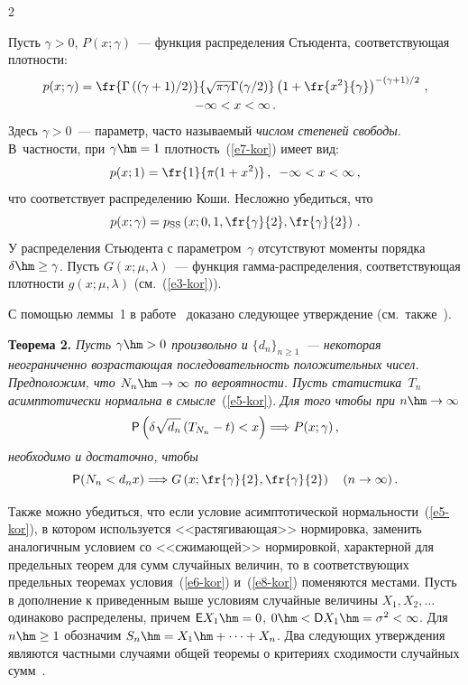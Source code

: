 \begin{multicols}{2}
\smallskip

Пусть $\gamma>0$, $P(x;\gamma)$~--- функция распределения
Стьюдента, соответствующая плот\-ности:
\begin{multline}
p(x;\gamma) =
\fr{\Gamma\left((\gamma+1)/2\right)}{\sqrt{\pi\gamma}\Gamma
(\gamma/2)}\left(1+\fr{x^2}{\gamma}\right)^{-(\gamma+1)/2}\,,\\
 -\infty<x<\infty\,.\label{e7-kor}
\end{multline}
Здесь $\gamma>0$~--- параметр, часто называемый \textit{чис\-лом
степеней свободы}. В~частности, при $\gamma\hm=1$ плот\-ность~(\ref{e7-kor}) имеет
вид:
$$
p(x;1)=\fr{1}{\pi(1+x^2)}\,,\enskip  -\infty<x<\infty\,,
$$
что соответствует распределению Коши. Несложно убедиться, что
$$
p(x;\gamma)=p_{\mathrm{SS}}\left(x;0,1,\fr{\gamma}{2},\fr{\gamma}{2}\right)\,.
$$
У распределения Стьюдента с параметром~$\gamma$ отсутствуют
моменты порядка $\delta\hm\ge\gamma$. Пусть $G(x;\mu,\lambda)$~---
функция гам\-ма-рас\-пре\-де\-ле\-ния, соответствующая плот\-ности
$g(x;\mu,\lambda)$ (см.~(\ref{e3-kor})).

С помощью леммы~1 в работе~\cite{BeningKorolev2004} доказано
следующее утверждение (см.\ так\-же~\cite{Korolev2011, KorolevBeningShorgin2011}).

\smallskip

\noindent
\textbf{Теорема 2.} \textit{Пусть $\gamma\hm>0$ произвольно и
$\{d_n\}_{n\ge1}$~--- некоторая неограниченно возрастающая
последовательность положительных чисел. Предположим, что
$N_n\hm\to\infty$ по вероятности. Пусть статистика~$T_n$
асимптотически нормальна в смысле}~(\ref{e5-kor}). \textit{Для того чтобы при}
$n\hm\to\infty$
$$
{\sf P}\left(\delta\sqrt{d_n}\left(T_{N_n}-t\right)<x\right) 
\Longrightarrow  P(x;\gamma)\,,
$$
\textit{необходимо и достаточно, чтобы}
\begin{equation}
{\sf P}(N_n<d_nx)\Longrightarrow G\left(x;\fr{\gamma}{2},\fr{\gamma}{2}\right)\quad
(n\to\infty)\,.\label{e8-kor}
\end{equation}

\smallskip

Также можно убедиться, что если условие асимптотической
нормальности~(\ref{e5-kor}), в котором используется <<растягивающая>>
нормировка, заменить аналогич\-ным условием со <<сжимающей>>
нормировкой, характерной для предельных теорем для сумм случайных
величин, то в соответствующих предельных теоремах условия~(\ref{e6-kor}) и~(\ref{e8-kor}) 
поменяются местами. Пусть в дополнение к приведенным выше
условиям случайные величины $X_1,X_2,\ldots$ одинаково
распределены, причем ${\sf E}X_1\hm=0$, $0\hm<{\sf
D}X_1\hm=\sigma^2<\infty$. Для $n\hm\ge1$ обозначим
$S_n\hm=X_1\hm+\cdots+X_n$. Два следующих утверждения являются частными
случаями общей теоремы о критериях сходимости случайных сумм~\cite{Korolev1994}.


\end{multicols}
